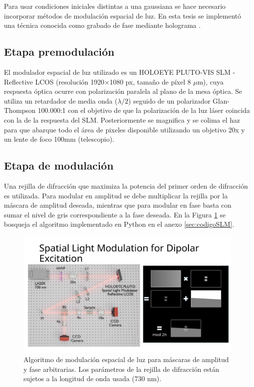 Para usar condiciones iniciales distintas a una gaussiana se hace necesario incorporar métodos de modulación espacial de luz. En esta tesis se implementó una técnica conocida como grabado de fase mediante holograma \citep{terhalle}.

\subsection{Etapa premodulación}
El modulador espacial de luz utilizado es un HOLOEYE PLUTO-VIS SLM - Reflective LCOS (resolución 1920$\times$1080 px, tamaño de píxel 8 $\mu$m), cuya respuesta óptica ocurre con polarización paralela al plano de la mesa óptica. Se utiliza un retardador de media onda ($\lambda/2$) seguido de un polarizador Glan-Thompson 100.000:1 con el objetivo de que la polarización de la luz láser coincida con la de la respuesta del SLM. Posteriormente se magnifica y se colima el haz para que abarque todo el área de pixeles disponible utilizando un objetivo 20x y un lente de foco 100mm (telescopio).

\subsection{Etapa de modulación}
Una rejilla de difracción que maximiza la potencia del primer orden de difracción es utilizada. Para modular en amplitud se debe multiplicar la rejilla por la máscara de amplitud deseada, mientras que para modular en fase basta con sumar el nivel de gris correspondiente a la fase deseada. En la Figura \ref{fig:SLMblaze} se bosqueja el algoritmo implementado en Python en el anexo \ref{sec:codigoSLM}.

{
\begin{figure}
    \centering
    \includegraphics[width=0.35\linewidth, trim={19.5cm 0 0 5cm}, clip]{media/SLMblaze4.png}
    \caption[Modulación espacial de luz para máscaras de amplitud y fase arbitrarias.]{Algoritmo de modulación espacial de luz para máscaras de amplitud y fase arbitrarias. Los parámetros de la rejilla de difracción están sujetos a la longitud de onda usada (730 nm).\label{fig:SLMblaze}}
\end{figure}
}

